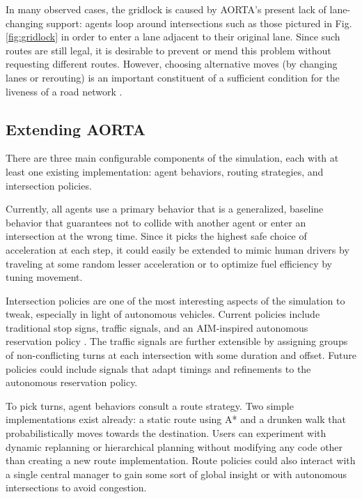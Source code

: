\documentclass[letterpaper, 10 pt, conference]{ieeeconf}  %
\begin{document}
In many observed cases, the gridlock is caused by AORTA's present lack of
lane-changing support: agents loop around intersections such as those pictured
in Fig. \ref{fig:gridlock} in order to enter a lane adjacent to their original
lane. Since such routes are still legal, it is desirable to prevent or mend this
problem without requesting different routes. However, choosing alternative moves
(by changing lanes or rerouting) is an important constituent of a sufficient
condition for the liveness of a road network \cite{AAAI11-au}.

\subsection{Extending AORTA}
\label{sec:config}

There are three main configurable components of the simulation, each with at
least one existing implementation: agent behaviors, routing strategies, and
intersection policies.

Currently, all agents use a primary behavior that is a generalized, baseline
behavior that guarantees not to collide with another agent or enter an
intersection at the wrong time. Since it picks the highest safe choice of
acceleration at each step, it could easily be extended to mimic human drivers by
traveling at some random lesser acceleration or to optimize fuel efficiency
by tuning movement.

Intersection policies are one of the most interesting aspects of the simulation
to tweak, especially in light of autonomous vehicles. Current policies include
traditional stop signs, traffic signals, and an AIM-inspired autonomous
reservation policy \cite{JAIR08-dresner}. The traffic signals are further
extensible by assigning groups of non-conflicting turns at each intersection
with some duration and offset. Future policies could include signals that adapt
timings and refinements to the autonomous reservation policy.

To pick turns, agent behaviors consult a route strategy. Two simple
implementations exist already: a static route using A* \cite{astar} and a
drunken walk that probabilistically moves towards the destination. Users can
experiment with dynamic replanning or hierarchical planning
\cite{Botea04nearoptimal} without modifying any code other than creating a new
route implementation. Route policies could also interact with a single central
manager to gain some sort of global insight or with autonomous intersections to
avoid congestion.
\end{document}
